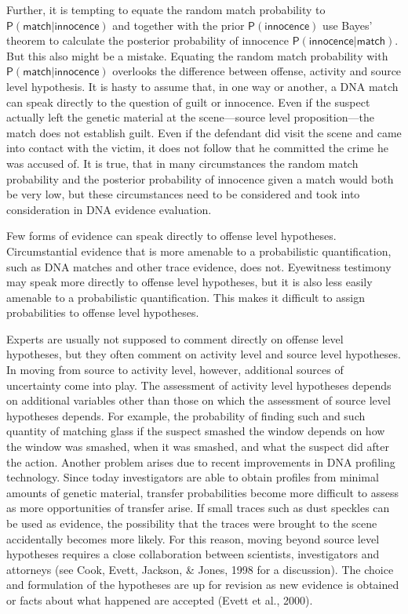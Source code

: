 \documentclass[10pt,dvipsnames,enabledeprecatedfontcommands]{scrartcl}
\newcommand{\pr}[1]{\mathsf{P}(#1)}
\begin{document}
Further, it is tempting to equate the random match probability to
\(\pr{\textsf{match} \vert \textsf{innocence}}\) and together with the
prior \(\pr{\textsf{innocence}}\) use Bayes' theorem to calculate the
posterior probability of innocence
\(\pr{\textsf{innocence} \vert \textsf{match}}\). But this also might be
a mistake. Equating the random match probability with
\(\pr{\textsf{match} \vert \textsf{innocence}}\) overlooks the
difference between offense, activity and source level hypothesis. It is
hasty to assume that, in one way or another, a DNA match can speak
directly to the question of guilt or innocence. Even if the suspect
actually left the genetic material at the scene---source level
proposition---the match does not establish guilt. Even if the defendant
did visit the scene and came into contact with the victim, it does not
follow that he committed the crime he was accused of. It is true, that
in many circumstances the random match probability and the posterior
probability of innocence given a match would both be very low, but these
circumstances need to be considered and took into consideration in DNA
evidence evaluation.

Few forms of evidence can speak directly to offense level hypotheses.
Circumstantial evidence that is more amenable to a probabilistic
quantification, such as DNA matches and other trace evidence, does not.
Eyewitness testimony may speak more directly to offense level
hypotheses, but it is also less easily amenable to a probabilistic
quantification. This makes it difficult to assign probabilities to
offense level hypotheses.

Experts are usually not supposed to comment directly on offense level
hypotheses, but they often comment on activity level and source level
hypotheses. In moving from source to activity level, however, additional
sources of uncertainty come into play. The assessment of activity level
hypotheses depends on additional variables other than those on which the
assessment of source level hypotheses depends. For example, the
probability of finding such and such quantity of matching glass if the
suspect smashed the window depends on how the window was smashed, when
it was smashed, and what the suspect did after the action. Another
problem arises due to recent improvements in DNA profiling technology.
Since today investigators are able to obtain profiles from minimal
amounts of genetic material, transfer probabilities become more
difficult to assess as more opportunities of transfer arise. If small
traces such as dust speckles can be used as evidence, the possibility
that the traces were brought to the scene accidentally becomes more
likely. For this reason, moving beyond source level hypotheses requires
a close collaboration between scientists, investigators and attorneys
(see Cook, Evett, Jackson, \& Jones, 1998 for a discussion). The choice
and formulation of the hypotheses are up for revision as new evidence is
obtained or facts about what happened are accepted (Evett et al., 2000).
\end{document}
